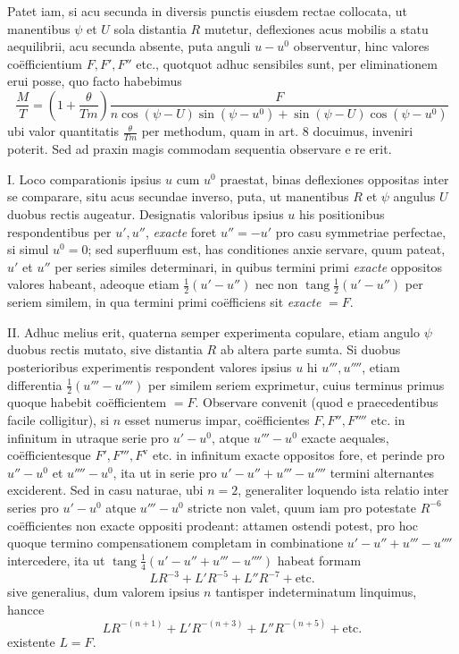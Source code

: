 Patet iam, si acu secunda in diversis punctis eiusdem rectae collocata, ut manentibus $\psi$ et $U$ sola distantia $R$ mutetur, deflexiones acus mobilis a statu aequilibrii, acu secunda absente, puta anguli $u-u^0$ observentur, hinc valores coëfficientium $F,F',F''$ etc., quotquot adhuc sensibiles sunt, per eliminationem erui posse, quo facto habebimus
\[
\frac MT=\left(1+\frac{\theta}{Tm}\right)\frac{F}{n\cos(\psi-U)\sin(\psi-u^0)+\sin(\psi-U)\cos(\psi-u^0)}
\]
ubi valor quantitatis $\frac{\theta}{Tm}$ per methodum, quam in art. $8$ docuimus, inveniri poterit. Sed ad praxin magis commodam sequentia observare e re erit.

I. Loco comparationis ipsius $u$ cum $u^0$ praestat, binas deflexiones oppositas inter se comparare, situ acus secundae inverso, puta, ut manentibus $R$ et $\psi$ angulus $U$ duobus rectis augeatur. Designatis valoribus ipsius $u$ his positionibus respondentibus per $u',u''$, \textit{exacte} foret $u''=-u'$ pro casu symmetriae perfectae, si simul $u^0=0$; sed superfluum est, has conditiones anxie servare, quum pateat, $u'$ et $u''$ per series similes determinari, in quibus termini primi \textit{exacte} oppositos valores habeant, adeoque etiam $\tfrac12(u'-u'')$ nec non $\operatorname{tang}\tfrac12(u'-u'')$ per seriem similem, in qua termini primi coëfficiens sit \textit{exacte} $=F$.

II. Adhuc melius erit, quaterna semper experimenta copulare, etiam angulo $\psi$ duobus rectis mutato, sive distantia $R$ ab altera parte sumta. Si duobus posterioribus experimentis respondent valores ipsius $u$ hi $u''',u''''$, etiam differentia $\tfrac12(u'''-u'''')$ per similem seriem exprimetur, cuius terminus primus quoque habebit coëfficientem $=F$. Observare convenit (quod e praecedentibus facile colligitur), si $n$ esset numerus impar, coëfficientes $F,F'',F''''$ etc. in infinitum in utraque serie pro $u'-u^0$, atque $u'''-u^0$ exacte aequales, coëfficientesque $F',F''',F^{\mathrm{v}}$ etc. in infinitum exacte oppositos fore, et perinde pro $u''-u^0$ et $u''''-u^0$, ita ut in serie pro $u'-u''+u'''-u''''$ termini alternantes exciderent. Sed in casu naturae, ubi $n=2$, generaliter loquendo ista relatio inter series pro $u'-u^0$ atque $u'''-u^0$ stricte non valet, quum iam pro potestate $R^{-6}$ coëfficientes non exacte oppositi prodeant: attamen ostendi potest, pro hoc quoque termino compensationem completam in combinatione $u'-u''+u'''-u''''$ intercedere, ita ut $\operatorname{tang}\tfrac14(u'-u''+u'''-u'''')$ habeat formam
\[
LR^{-3}+L'R^{-5}+L''R^{-7}+\text{etc.}
\]
sive generalius, dum valorem ipsius $n$ tantisper indeterminatum linquimus, hancce
\[
LR^{-(n+1)}+L'R^{-(n+3)}+L''R^{-(n+5)}+\text{etc.}
\]
existente $L=F$.

